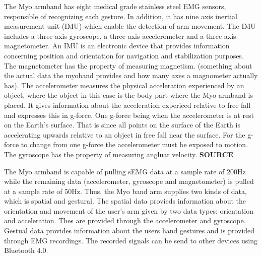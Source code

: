 The Myo armband has eight medical grade stainless steel EMG sensors, responsible of recognizing each gesture. In addition, it has nine axis inertial measurement unit (IMU) which enable the detection of arm movement. The IMU includes a three axis gyroscope, a three axis accelerometer and a three axis magnetometer. An IMU is an electronic device that provides information concerning position and orientation for navigation and stabilization purposes. The magnetometer has the property of measuring magnetism. (something about the actual data the myoband provides and how many axes a magnometer actually has). The accelerometer measures the physical acceleration experienced by an object, where the object in this case is the body part where the Myo armband is placed. It gives information about the acceleration expericed relative to free fall and expresses this in g-force. One g-force being when the accelerometer is at rest on the Earth's surface. That is since all points on the surface of the Earth is accelerating upwards relative to an object in free fall near the surface. For the g-force to change from one g-force the accelerometer must be exposed to motion. The gyroscope has the property of measuring angluar velocity. \textbf{SOURCE}


The Myo armband is capable of pulling sEMG data at a sample rate of 200Hz while the remaining data (accelerometer, gyroscope and magnetometer) is pulled at a sample rate of  50Hz. 
Thus, the Myo band arm supplies two kinds of data, which is spatial and gestural. The spatial data provieds information about the orientation and movement of the user's arm given by two data types: orientation and acceleration. Thes are provided through the accelerometer and gyroscope. Gestual data provides information about the users hand gestures and is provided through EMG recordings. The recorded signals can be send to other devices using Bluetooth 4.0.







